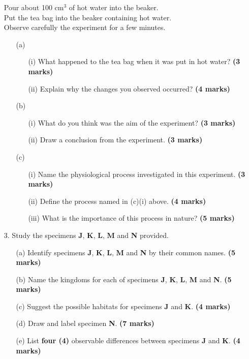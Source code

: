 \begin{enumerate}
Pour about 100 cm$^3$ of hot water into the beaker.\\
Put the tea bag into the beaker containing hot water.\\
Observe carefully the experiment for a few minutes.
\begin{enumerate}
\item[(a)]
\begin{enumerate}
\item[(i)] What happened to the tea bag when it was put in hot water? \hfill \textbf{(3 marks)}
\item[(ii)] Explain why the changes you observed occurred? \hfill \textbf{(4 marks)}
\end{enumerate}
\item[(b)]
\begin{enumerate}
\item[(i)] What do you think was the aim of the experiment? \hfill \textbf{(3 marks)}
\item[(ii)] Draw a conclusion from the experiment. \hfill \textbf{(3 marks)}
\end{enumerate}
\item[(c)]
\begin{enumerate}
\item[(i)] Name the physiological process investigated in this experiment. \hfill \textbf{(3 marks)}
\item[(ii)] Define the process named in (c)(i) above. \hfill \textbf{(4 marks)}
\item[(iii)] What is the importance of this process in nature? \hfill \textbf{(5 marks)}
\end{enumerate}
\end{enumerate}

\item[3.] Study the specimens \textbf{J}, \textbf{K}, \textbf{L}, \textbf{M} and \textbf{N} provided.
\begin{enumerate}
\item[(a)] Identify specimens \textbf{J}, \textbf{K}, \textbf{L}, \textbf{M} and \textbf{N} by their common names. \hfill \textbf{(5 marks)}
\item[(b)] Name the kingdoms for each of specimens \textbf{J}, \textbf{K}, \textbf{L}, \textbf{M} and \textbf{N}. \hfill \textbf{(5 marks)}
\item[(c)] Suggest the possible habitats for specimens \textbf{J} and \textbf{K}. \hfill \textbf{(4 marks)}
\item[(d)] Draw and label specimen \textbf{N}. \hfill \textbf{(7 marks)}
\item[(e)] List \textbf{four (4)} observable differences between specimens \textbf{J} and \textbf{K}. \hfill \textbf{(4 marks)}
\end{enumerate}
\end{enumerate}